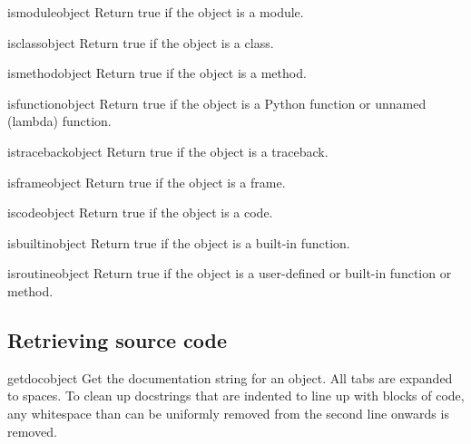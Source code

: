 \begin{funcdesc}{ismodule}{object}
  Return true if the object is a module.
\end{funcdesc}

\begin{funcdesc}{isclass}{object}
  Return true if the object is a class.
\end{funcdesc}

\begin{funcdesc}{ismethod}{object}
  Return true if the object is a method.
\end{funcdesc}

\begin{funcdesc}{isfunction}{object}
  Return true if the object is a Python function or unnamed (lambda) function.
\end{funcdesc}

\begin{funcdesc}{istraceback}{object}
  Return true if the object is a traceback.
\end{funcdesc}

\begin{funcdesc}{isframe}{object}
  Return true if the object is a frame.
\end{funcdesc}

\begin{funcdesc}{iscode}{object}
  Return true if the object is a code.
\end{funcdesc}

\begin{funcdesc}{isbuiltin}{object}
  Return true if the object is a built-in function.
\end{funcdesc}

\begin{funcdesc}{isroutine}{object}
  Return true if the object is a user-defined or built-in function or method.
\end{funcdesc}

\subsection{Retrieving source code
            \label{inspect-source}}

\begin{funcdesc}{getdoc}{object}
  Get the documentation string for an object.
  All tabs are expanded to spaces.  To clean up docstrings that are
  indented to line up with blocks of code, any whitespace than can be
  uniformly removed from the second line onwards is removed.
\end{funcdesc}

